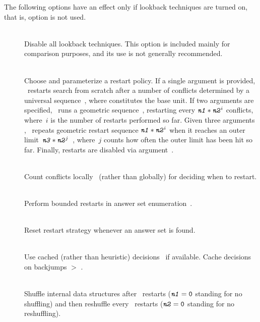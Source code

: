 The following options have an effect only if lookback techniques
are turned on, that is, option  is not used.
%
\begin{description}
\item[]~\\
Disable all lookback techniques.
This option is included mainly for comparison purposes, and its use
is not generally recommended.
\item[]~\\
Choose and parameterize a restart policy.
If a single argument  is provided,
\clasp\ restarts search from scratch after a number of conflicts
determined by a universal sequence~\cite{lusizu93a}, where 
constitutes the base unit.
If two arguments  are specified,
\clasp\ runs a geometric sequence~\cite{eensor03a},
restarting every $\texttt{\textit{n1}}*\texttt{\textit{n2}}^i$ conflicts,
where~$i$ is the number of restarts performed so far.
Given three arguments ,
\clasp\ repeats geometric restart sequence $\texttt{\textit{n1}}*\texttt{\textit{n2}}^i$
when it reaches an outer limit~$\texttt{\textit{n3}}*\texttt{\textit{n2}}^j$~\cite{biere08a},
where~$j$ counts how often the outer limit has been hit so far.
Finally, restarts are disabled via argument~.
\item[]~\\
Count conflicts locally~\cite{ryvstr08a} (rather than globally)
for deciding when to restart.
\item[]~\\
Perform bounded restarts in answer set enumeration~\cite{gekanesc07c}.
\item[]~\\
Reset restart strategy whenever an answer set is found.
\item[]~\\
Use cached (rather than heuristic) decisions~\cite{pipdar07a} if available.
Cache decisions on backjumps $>$ .
\item[]~\\
Shuffle internal data structures after~ restarts
($\texttt{\textit{n1}}=\texttt{0}$ standing for no shuffling)
and then reshuffle every~ restarts 
($\texttt{\textit{n2}}=\texttt{0}$ standing for no reshuffling).

\end{description}
